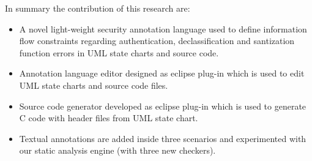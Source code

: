 In summary the contribution of this research are:
\begin{itemize}
 \item A novel light-weight security annotation language
	used to define information flow constraints regarding authentication, declassification and santization function errors in UML state charts and source code.
	
\item Annotation language editor designed as eclipse
	plug-in which is used to edit UML state charts and
	source code files.
	
\item Source code generator developed as eclipse plug-in which is used to generate C code with header files from UML state chart.
	
\item Textual annotations are added inside three scenarios and experimented with our static analysis engine (with three new checkers).

\end{itemize}

 


